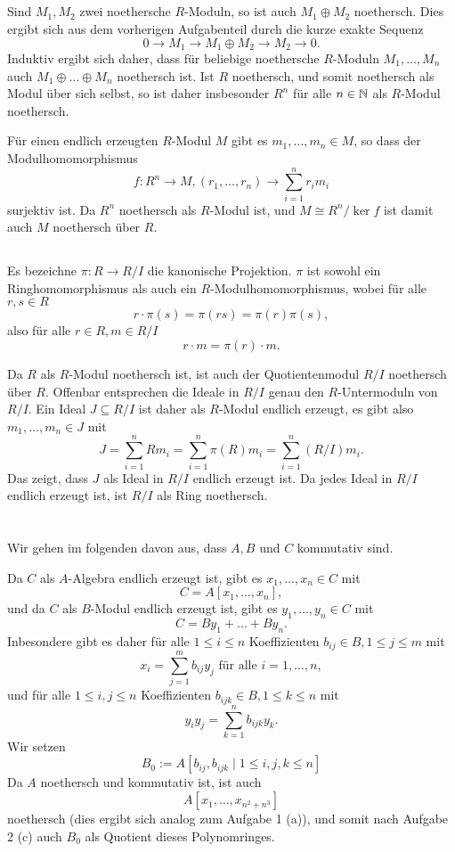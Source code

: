 \documentclass[a4paper,10pt]{article}
\begin{document}
\subsection{}
Sind $M_1, M_2$ zwei noethersche $R$-Moduln, so ist auch $M_1 \oplus M_2$ noethersch. Dies ergibt sich aus dem vorherigen Aufgabenteil durch die kurze exakte Sequenz
\[
 0 \to M_1 \to M_1 \oplus M_2 \to M_2 \to 0.
\]
Induktiv ergibt sich daher, dass für beliebige noethersche $R$-Moduln $M_1, \ldots, M_n$ auch $M_1 \oplus \ldots \oplus M_n$ noethersch ist. Ist $R$ noethersch, und somit noethersch als Modul über sich selbst, so ist daher insbesonder $R^n$ für alle $n \in \mathbb{N}$ als $R$-Modul noethersch.

Für einen endlich erzeugten $R$-Modul $M$ gibt es $m_1, \ldots, m_n \in M$, so dass der Modulhomomorphismus
\[
 f: R^n \to M, (r_1, \ldots, r_n) \to \sum_{i=1}^n r_i m_i
\]
surjektiv ist. Da $R^n$ noethersch als $R$-Modul ist, und $M \cong R^n / \ker f$ ist damit auch $M$ noethersch über $R$.


\subsection{}
Es bezeichne $\pi : R \to R/I$ die kanonische Projektion. $\pi$ ist sowohl ein Ringhomomorphismus als auch ein $R$-Modulhomomorphismus, wobei für alle $r, s \in R$
\[
 r \cdot \pi(s) = \pi(rs) = \pi(r) \pi(s),
\]
also für alle $r \in R, m \in R/I$
\[
 r \cdot m = \pi(r) \cdot m.
\]

Da $R$ als $R$-Modul noethersch ist, ist auch der Quotientenmodul $R/I$ noethersch über $R$. Offenbar entsprechen die Ideale in $R/I$ genau den $R$-Untermoduln von $R/I$. Ein Ideal $J \subseteq R/I$ ist daher als $R$-Modul endlich erzeugt, es gibt also $m_1, \ldots, m_n \in J$ mit
\[
 J = \sum_{i=1}^n R m_i = \sum_{i=1}^n \pi(R) m_i = \sum_{i=1}^n (R/I) m_i.
\]
Das zeigt, dass $J$ als Ideal in $R/I$ endlich erzeugt ist. Da jedes Ideal in $R/I$ endlich erzeugt ist, ist $R/I$ als Ring noethersch.


\section{}
Wir gehen im folgenden davon aus, dass $A, B$ und $C$ kommutativ sind.

Da $C$ als $A$-Algebra endlich erzeugt ist, gibt es $x_1, \ldots, x_n \in C$ mit
\[
 C = A[x_1, \ldots, x_n],
\]
und da $C$ als $B$-Modul endlich erzeugt ist, gibt es $y_1, \ldots, y_n \in C$ mit
\[
 C = By_1 + \ldots + By_n.
\]
Inbesondere gibt es daher für alle $1 \leq i \leq n$ Koeffizienten $b_{ij} \in B, 1 \leq j \leq m$ mit
\[
 x_i = \sum_{j=1}^m b_{ij} y_j \text{ für alle } i = 1, \ldots, n,
\]
und für alle $1 \leq i,j \leq n$ Koeffizienten $b_{ijk} \in B, 1 \leq k \leq n$ mit
\[
 y_i y_j = \sum_{k=1}^n b_{ijk} y_k.
\]
Wir setzen
\[
 B_0 := A[b_{ij}, b_{ijk} \mid 1 \leq i,j,k \leq n]
\]
Da $A$ noethersch und kommutativ ist, ist auch
\[
 A[x_1, \ldots, x_{n^2 + n^3}]
\]
noethersch (dies ergibt sich analog zum Aufgabe 1 (a)), und somit nach Aufgabe 2 (c) auch $B_0$ als Quotient dieses Polynomringes. 
\end{document}
